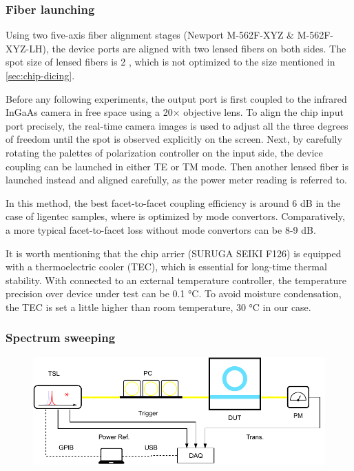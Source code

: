 \subsubsection{Fiber launching} 

Using two five-axis fiber alignment stages (Newport M-562F-XYZ \& M-562F-XYZ-LH), the device ports are aligned with two lensed fibers on both sides. The spot size of lensed fibers is 2 \um, which is not optimized to the size mentioned in \autoref{sec:chip-dicing}. 

Before any following experiments, the output port is first coupled to the infrared InGaAs camera in free space using a 20$\times$ objective lens. To align the chip input port precisely, the real-time camera images is used to adjust all the three degrees of freedom until the spot is observed explicitly on the screen. Next, by carefully rotating the palettes of polarization controller on the input side, the device coupling can be launched in either TE or TM mode. Then another lensed fiber is launched instead and aligned carefully, as the power meter reading is referred to.

In this method, the best facet-to-facet coupling efficiency is around 6 dB in the case of ligentec samples, where is optimized by mode convertors. Comparatively, a more typical facet-to-facet loss without mode convertors can be 8-9 dB.

It is worth mentioning that the chip arrier (SURUGA SEIKI F126) is equipped with a thermoelectric cooler (TEC), which is essential for long-time thermal stability. 
With connected to an external temperature controller, the temperature precision over device under test can be 0.1 \si{\celsius}.
To avoid moisture condensation, the TEC is set a little higher than room temperature, 30 \si{\celsius} in our case. 

\subsubsection{Spectrum sweeping}

\begin{figure}
	\centering
	\includegraphics[width=1\textwidth]{imgs/trans.pdf}
	\label{fig:transsetup}
\end{figure}

